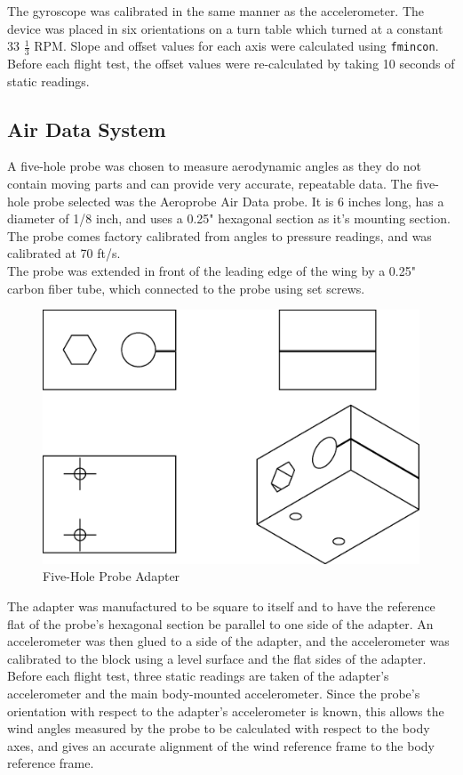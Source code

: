 The gyroscope was calibrated in the same manner as the accelerometer. The device was placed in six orientations on a turn table which turned at a constant 33 $\frac{1}{3}$ RPM. Slope and offset values for each axis were calculated using \texttt{fmincon}. Before each flight test, the offset values were re-calculated by taking 10 seconds of static readings.\\

\subsection*{Air Data System}
A five-hole probe was chosen to measure aerodynamic angles as they do not contain moving parts and can provide very accurate, repeatable data. The five-hole probe selected was the Aeroprobe Air Data probe. It is 6 inches long, has a diameter of 1/8 inch, and uses a 0.25" hexagonal section as it's mounting section. The probe comes factory calibrated from angles to pressure readings, and was calibrated at 70 ft/s.\\
The probe was extended in front of the leading edge of the wing by a 0.25" carbon fiber tube, which connected to the probe using set screws.
\begin{figure}[H]

  \centering
    \includegraphics[width=.5\textwidth]{figures/probeAdapter.eps}
      \caption{Five-Hole Probe Adapter} \label{fig:probeAdapter}
\end{figure}
The adapter was manufactured to be square to itself and to have the reference flat of the probe's hexagonal section be parallel to one side of the adapter. An accelerometer was then glued to a side of the adapter, and the accelerometer was calibrated to the block using a level surface and the flat sides of the adapter. Before each flight test, three static readings are taken of the adapter's accelerometer and the main body-mounted accelerometer. Since the probe's orientation with respect to the adapter's accelerometer is known, this allows the wind angles measured by the probe to be calculated with respect to the body axes, and gives an accurate alignment of the wind reference frame to the body reference frame.\\

